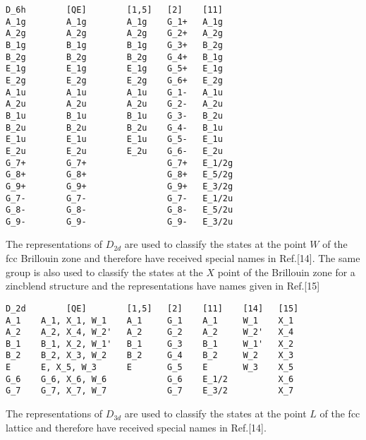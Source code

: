 \documentclass[12pt,a4paper,twoside]{report}
\begin{document}
\begin{tcolorbox}
\begin{footnotesize}
\begin{verbatim}
D_6h        [QE]        [1,5]   [2]    [11]
A_1g        A_1g        A_1g    G_1+   A_1g
A_2g        A_2g        A_2g    G_2+   A_2g
B_1g        B_1g        B_1g    G_3+   B_2g
B_2g        B_2g        B_2g    G_4+   B_1g
E_1g        E_1g        E_1g    G_5+   E_1g
E_2g        E_2g        E_2g    G_6+   E_2g
A_1u        A_1u        A_1u    G_1-   A_1u
A_2u        A_2u        A_2u    G_2-   A_2u
B_1u        B_1u        B_1u    G_3-   B_2u
B_2u        B_2u        B_2u    G_4-   B_1u
E_1u        E_1u        E_1u    G_5-   E_1u
E_2u        E_2u        E_2u    G_6-   E_2u
G_7+        G_7+                G_7+   E_1/2g
G_8+        G_8+                G_8+   E_5/2g
G_9+        G_9+                G_9+   E_3/2g
G_7-        G_7-                G_7-   E_1/2u
G_8-        G_8-                G_8-   E_5/2u
G_9-        G_9-                G_9-   E_3/2u
\end{verbatim}
\end{footnotesize}
\end{tcolorbox}

The representations of $D_{2d}$ are used to classify the states at the
point $W$ of the fcc Brillouin zone and therefore have received special names 
in Ref.[14]. The same group is also used to classify the states at the
$X$ point of the Brillouin zone for a zincblend structure and the
representations have names given in Ref.[15]

\begin{tcolorbox}
\begin{footnotesize}
\begin{verbatim}
D_2d        [QE]        [1,5]   [2]    [11]    [14]   [15]
A_1    A_1, X_1, W_1    A_1     G_1    A_1     W_1    X_1
A_2    A_2, X_4, W_2'   A_2     G_2    A_2     W_2'   X_4
B_1    B_1, X_2, W_1'   B_1     G_3    B_1     W_1'   X_2
B_2    B_2, X_3, W_2    B_2     G_4    B_2     W_2    X_3
E      E, X_5, W_3      E       G_5    E       W_3    X_5
G_6    G_6, X_6, W_6            G_6    E_1/2          X_6
G_7    G_7, X_7, W_7            G_7    E_3/2          X_7
\end{verbatim}
\end{footnotesize}
\end{tcolorbox}

The representations of $D_{3d}$ are used to classify the states at the
point $L$ of the fcc lattice and therefore have received special names 
in Ref.[14].
\end{document}
